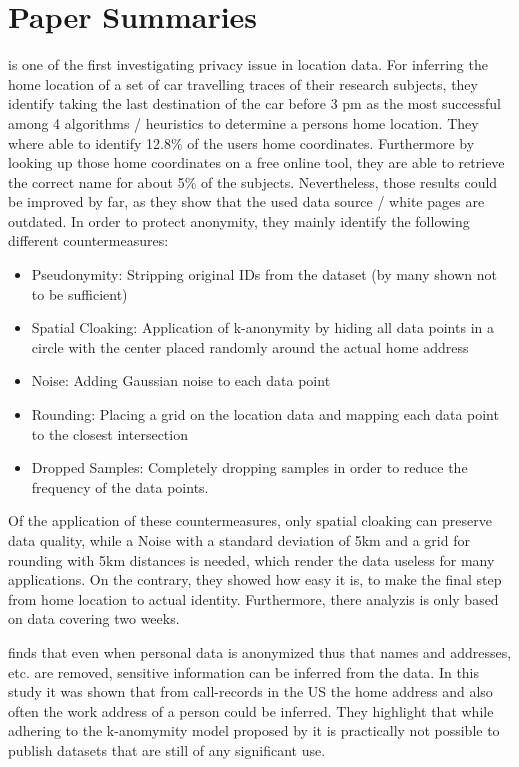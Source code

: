 \chapter{Paper Summaries}\label{chapter:paper-summaries}

\parencite{krumm} is one of the first investigating privacy issue in location data. For inferring the home location of a set of car travelling traces of their research subjects, they identify taking the last destination of the car before 3 pm as the most successful among 4 algorithms / heuristics to determine a persons home location. They where able to identify 12.8\% of the users home coordinates. Furthermore by looking up those home coordinates on a free online tool, they are able to retrieve the correct name for about 5\% of the subjects. Nevertheless, those results could be improved by far, as they show that the used data source / white pages are outdated.
In order to protect anonymity, they mainly identify the following different countermeasures:
\begin{itemize}
	\item Pseudonymity: Stripping original IDs from the dataset (by many shown not to be sufficient)
	\item Spatial Cloaking: Application of k-anonymity by hiding all data points in a circle with the center placed randomly around the actual home address
	\item Noise: Adding Gaussian noise to each data point
	\item Rounding: Placing a grid on the location data and mapping each data point to the closest intersection
	\item Dropped Samples: Completely dropping samples in order to reduce the frequency of the data points.
\end{itemize}
Of the application of these countermeasures, only spatial cloaking can preserve data quality, while a Noise with a standard deviation of 5km and a grid for rounding with 5km distances is needed, which render the data useless for many applications.
On the contrary, they showed how easy it is, to make the final step from home location to actual identity. Furthermore, there analyzis is only based on data covering two weeks.


\parencite{cellphone} finds that even when personal data is anonymized thus that names and addresses, etc. are removed, sensitive information can be inferred from the data.
In this study it was shown that from call-records in the US the home address and also often the work address of a person could be inferred.
They highlight that while adhering to the k-anomymity model proposed by \parencite{k-anonymity} it is practically not possible to publish datasets that are still of any significant use.
\\

